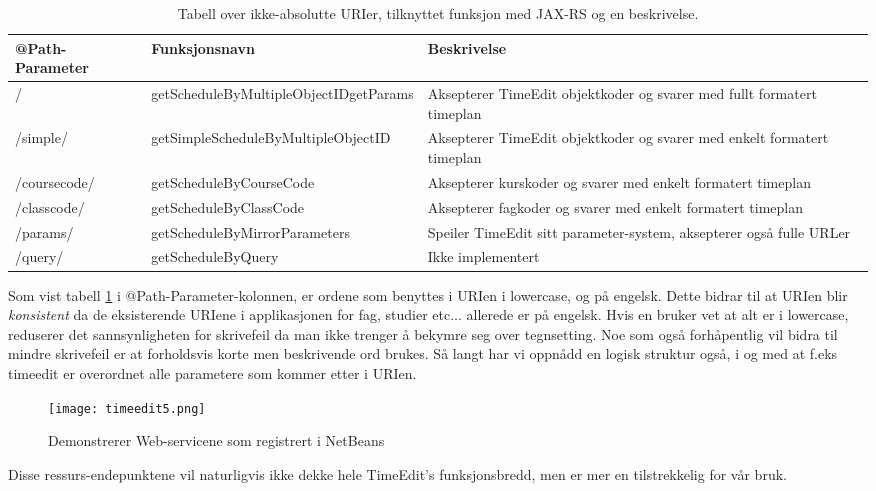 \documentclass[../main.tex]{subfiles}
\begin{document}
\begin{table}[H]
\begin{center}
\caption{Tabell over ikke-absolutte URIer, tilknyttet funksjon med JAX-RS og en beskrivelse.}
\label{table:timeeditd}
  \begin{tabular}{ | p{4cm} | p{6cm} | p{6cm} |}
    \hline
    @Path-Parameter & Funksjonsnavn & Beskrivelse \\ \hline
/ & getScheduleByMultipleObjectID\newline getParams & Aksepterer TimeEdit objektkoder og svarer med fullt formatert timeplan \\ \hline
/simple/ & getSimpleScheduleByMultipleObjectID & Aksepterer TimeEdit objektkoder og svarer med enkelt formatert timeplan \\ \hline
/coursecode/ & getScheduleByCourseCode & Aksepterer kurskoder og svarer med enkelt formatert timeplan \\ \hline
/classcode/ & getScheduleByClassCode & Aksepterer fagkoder og svarer med enkelt formatert timeplan \\ \hline
/params/ & getScheduleByMirrorParameters & Speiler TimeEdit sitt parameter-system, aksepterer også fulle URLer \\ \hline
/query/ & getScheduleByQuery & Ikke implementert \\
    \hline
  \end{tabular}
\end{center}
\end{table}

Som vist tabell \ref{table:timeeditd}  i @Path-Parameter-kolonnen, er ordene som benyttes i URIen i lowercase, og på engelsk. Dette bidrar til at URIen blir \textit{konsistent} da de eksisterende URIene i applikasjonen for fag, studier etc... allerede er på engelsk. Hvis en bruker vet at alt er i lowercase, reduserer det sannsynligheten for skrivefeil da man ikke trenger å bekymre seg over tegnsetting. Noe som også forhåpentlig vil bidra til mindre skrivefeil er at forholdsvis korte men beskrivende ord brukes. Så langt har vi oppnådd en logisk struktur også, i og med at f.eks timeedit er overordnet alle parametere som kommer etter i URIen.

\begin{figure}[H]
  \centering
  \texttt{[image: timeedit5.png]}
\caption{Demonstrerer Web-servicene som registrert i NetBeans}
\end{figure}

Disse ressurs-endepunktene vil naturligvis ikke dekke hele TimeEdit’s funksjonsbredd, men er mer en tilstrekkelig for vår bruk.
\end{document}
